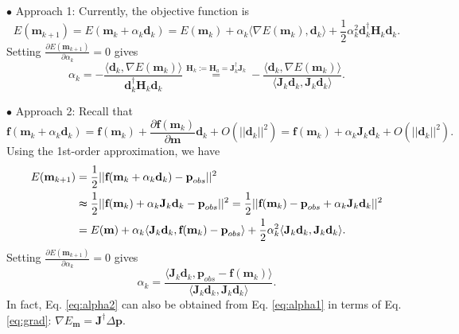 $\bullet$ Approach 1: Currently, the objective function is
\begin{equation}
E(\textbf{m}_{k+1})=E(\textbf{m}_k+\alpha_k \textbf{d}_{k})=E(\textbf{m}_k)+\alpha_k \langle\nabla E(\textbf{m}_k),\textbf{d}_k\rangle+\frac{1}{2}\alpha_k^2\textbf{d}_k^{\dagger}\textbf{H}_k\textbf{d}_k.
\end{equation}
Setting $\frac{\partial E(\textbf{m}_{k+1})}{\partial \alpha_k}=0$ gives
\begin{equation}\label{eq:alpha1}
\alpha_k=-\frac{\langle\textbf{d}_k,\nabla E(\textbf{m}_k)\rangle}{\textbf{d}_k^{\dagger}\textbf{H}_k\textbf{d}_k}
\overset{\textbf{H}_k:=\textbf{H}_a=\textbf{J}_k^{\dagger}\textbf{J}_k}{=}
-\frac{\langle\textbf{d}_k,\nabla E(\textbf{m}_k)\rangle}{\langle\textbf{J}_k\textbf{d}_k,\textbf{J}_k\textbf{d}_k\rangle}.
\end{equation}

$\bullet$ Approach 2:
Recall that
\begin{equation}\label{eq:1st_approx}
\textbf{f}(\textbf{m}_k+\alpha_k \textbf{d}_{k})
=\textbf{f}(\textbf{m}_k)+\frac{\partial \textbf{f}(\textbf{m}_k)}{\partial \textbf{m}}\textbf{d}_k+O(||\textbf{d}_k||^2)
=\textbf{f}(\textbf{m}_k)+\alpha_k \textbf{J}_k\textbf{d}_{k}+O(||\textbf{d}_k||^2).
\end{equation}
Using the 1st-order approximation, we have
\begin{equation}
\begin{split}
E(\textbf{m}_{k+1})&=\frac{1}{2} ||\textbf{f}(\textbf{m}_k+\alpha_k \textbf{d}_{k})-\textbf{p}_{obs}||^2\\
&\thickapprox\frac{1}{2} ||\textbf{f}(\textbf{m}_k)+\alpha_k \textbf{J}_k\textbf{d}_{k}-\textbf{p}_{obs}||^2
=\frac{1}{2} ||\textbf{f}(\textbf{m}_k)-\textbf{p}_{obs}+\alpha_k \textbf{J}_k\textbf{d}_{k}||^2\\
&=E(\textbf{m})+\alpha_k\langle\textbf{J}_k\textbf{d}_k,\textbf{f}(\textbf{m}_k)-\textbf{p}_{obs}\rangle+\frac{1}{2}\alpha_k^2\langle\textbf{J}_k\textbf{d}_k,\textbf{J}_k\textbf{d}_k\rangle.
\end{split}
\end{equation}
Setting $\frac{\partial E(\textbf{m}_{k+1})}{\partial \alpha_k}=0$ gives
\begin{equation}\label{eq:alpha2}
\alpha_k=\frac{\langle\textbf{J}_k\textbf{d}_k,\textbf{p}_{obs}-\textbf{f}(\textbf{m}_k)\rangle}
{\langle\textbf{J}_k\textbf{d}_k,\textbf{J}_k\textbf{d}_k\rangle}.
\end{equation}
In fact, Eq. \eqref{eq:alpha2} can also be obtained from Eq. \eqref{eq:alpha1} in terms of Eq. \eqref{eq:grad}: $\nabla E_{\textbf{m}}=\textbf{J}^{\dagger}\Delta \textbf{p}$. 

